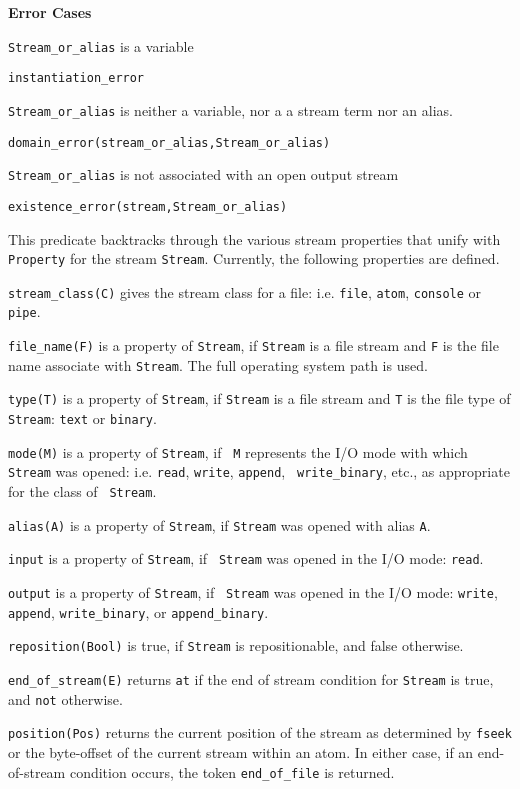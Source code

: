 \begin{description}
{\bf Error Cases}
\bi
\item 	{\tt Stream\_or\_alias} is a variable
\bi
\item {\tt instantiation\_error}
\ei
\item {\tt Stream\_or\_alias} is neither a variable, nor a a stream
  term nor an alias.  
\bi
\item 	{\tt domain\_error(stream\_or\_alias,Stream\_or\_alias)}
\ei
\item 	{\tt Stream\_or\_alias} is not associated with an open output stream
\bi
\item 	{\tt existence\_error(stream,Stream\_or\_alias)}
\ei
\ei

%
This predicate backtracks through the various stream properties that
unify with {\tt Property} for the stream {\tt Stream}.  Currently,
the following properties are defined.

\bi
\item {\tt stream\_class(C)} gives the stream class for a file:
i.e. {\tt file}, {\tt atom}, {\tt console} or {\tt pipe}.

\item {\tt file\_name(F)} is a property of {\tt Stream}, if
{\tt Stream} is a file stream and {\tt F} is the file name
associate with {\tt Stream}.  The full operating system
path is used.
%
\item {\tt type(T)} is a property of {\tt Stream}, if
{\tt Stream} is a file stream and {\tt T} is the file type
of {\tt Stream}: {\tt text} or {\tt binary}.
%
\item {\tt mode(M)} is a property of {\tt Stream}, if {\tt
M} represents the I/O mode with which {\tt Stream} was
opened: i.e. {\tt read}, {\tt write}, {\tt append}, {\tt
write\_binary}, etc., as appropriate for the class of {\tt
Stream}.
%
\item {\tt alias(A)}  is a property of {\tt Stream}, if
{\tt Stream} was opened with alias {\tt A}.
%
\item {\tt input}  is a property of {\tt Stream}, if {\tt
Stream} was opened in the I/O mode: {\tt read}.
% 
\item {\tt output}  is a property of {\tt Stream}, if {\tt
Stream} was opened in the I/O mode: {\tt write}, {\tt
append}, {\tt write\_binary}, or {\tt append\_binary}.
%
\item {\tt reposition(Bool)} is true, if {\tt Stream} is
repositionable, and false otherwise. 
%
\item {\tt end\_of\_stream(E)} returns {\tt at} if the end of stream
condition for {\tt Stream} is true, and {\tt not} otherwise.
%
\item {\tt position(Pos)} returns the current position of the stream
as determined by {\tt fseek{}} or the byte-offset of the current
stream within an atom.  In either case, if an end-of-stream condition
occurs, the token {\tt end\_of\_file} is returned.
%


\end{description}
